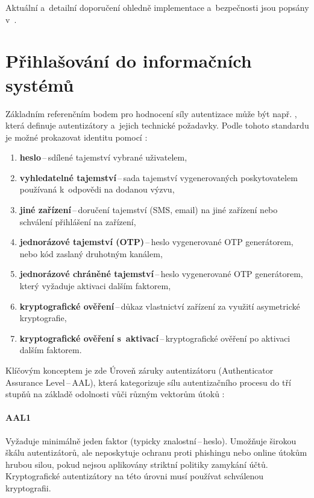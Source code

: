 \vspace{8px}
\noindent Aktuální a~detailní doporučení ohledně implementace a~bezpečnosti jsou popsány v~\cite{rfc-8725}.

\section{Přihlašování do informačních systémů}
\label{sec:prihlasovani}
Základním referenčním bodem pro hodnocení síly autentizace může být např. \cite{NIST-800-63B-4}, která definuje autentizátory a~jejich technické požadavky.
Podle tohoto standardu je možné prokazovat identitu pomocí \cite[2.1.1]{NIST-800-63B-4}:
\begin{enumerate}
    \item \textbf{heslo}\,--\,sdílené tajemství vybrané uživatelem,
    \item \textbf{vyhledatelné tajemství}\,--\,sada tajemství vygenerovaných poskytovatelem používaná k~odpovědi na dodanou výzvu,
    \item \textbf{jiné zařízení}\,--\,doručení tajemství (SMS, email) na jiné zařízení nebo schválení přihlášení na zařízení,
    \item \textbf{jednorázové tajemství (OTP)}\,--\,heslo vygenerované OTP generátorem, nebo kód zaslaný druhotným kanálem,
    \item \textbf{jednorázové chráněné tajemství}\,--\,heslo vygenerované OTP generátorem, který vyžaduje aktivaci dalším faktorem,
    \item \textbf{kryptografické ověření}\,--\,důkaz vlastnictví zařízení za využití asymetrické kryptografie,
    \item \textbf{kryptografické ověření s~aktivací}\,--\,kryptografické ověření po aktivaci dalším faktorem.
\end{enumerate}

Klíčovým konceptem je zde Úroveň záruky autentizátoru (Authenticator Assurance Level\,--\,AAL), která kategorizuje sílu autentizačního procesu do tří stupňů na základě odolnosti vůči různým vektorům útoků \cite[2.1--2.5]{NIST-800-63B-4}:

\paragraph{AAL1}
Vyžaduje minimálně jeden faktor (typicky znalostní\,--\,heslo).
Umožňuje širokou škálu autentizátorů, ale neposkytuje ochranu proti phishingu nebo online útokům hrubou silou, pokud nejsou aplikovány striktní politiky zamykání účtů.
Kryptografické autentizátory na této úrovni musí používat schválenou kryptografii.


